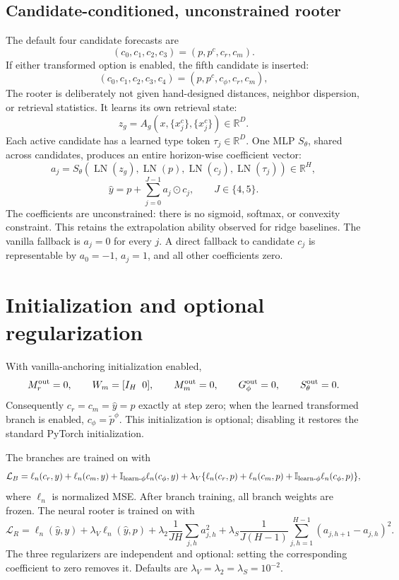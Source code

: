 \documentclass[10pt]{article}
\begin{document}
\subsection{Candidate-conditioned, unconstrained rooter}
The default four candidate forecasts are
\[
 (c_0,c_1,c_2,c_3)=(p,p^c,c_r,c_m).
\]
If either transformed option is enabled, the fifth candidate is inserted:
\[
(c_0,c_1,c_2,c_3,c_4)=(p,p^c,c_\phi,c_r,c_m),
\]
The rooter is deliberately not given hand-designed distances, neighbor
dispersion, or retrieval statistics.  It learns its own retrieval state:
\[
 z_g=A_g(x,\{x^c_j\},\{x^c_j\})\in\mathbb R^D.
\]
Each active candidate has a learned type token $\tau_j\in\mathbb R^D$.  One MLP
$S_\theta$, shared across candidates, produces an entire horizon-wise
coefficient vector:
\[
 a_j=S_\theta\!\left(
 \operatorname{LN}(z_g),\operatorname{LN}(p),
 \operatorname{LN}(c_j),\operatorname{LN}(\tau_j)
 \right)\in\mathbb R^H,
\]
\[
 \boxed{\quad \widehat y
 =p+\sum_{j=0}^{J-1}a_j\odot c_j,\qquad J\in\{4,5\}.\quad}
\]
The coefficients are unconstrained: there is no sigmoid, softmax, or convexity
constraint.  This retains the extrapolation ability observed for ridge
baselines.  The vanilla fallback is $a_j=0$ for every $j$.  A direct fallback
to candidate $c_j$ is representable by $a_0=-1$, $a_j=1$, and all other
coefficients zero.

\section{Initialization and optional regularization}
With vanilla-anchoring initialization enabled,
\[
 M_r^{\rm out}=0,\qquad W_m=[I_H\;\;0],\qquad M_m^{\rm out}=0,
 \qquad G_\phi^{\rm out}=0,
 \qquad S_\theta^{\rm out}=0.
\]
Consequently $c_r=c_m=\widehat y=p$ exactly at step zero; when the learned
transformed branch is enabled, $c_\phi=\widetilde p^\phi$.  This initialization
is optional; disabling it restores the standard PyTorch initialization.

The branches are trained on \Tone with
\[
 \mathcal L_B=
 \ell_n(c_r,y)+\ell_n(c_m,y)
 +\mathbb I_{\rm learn\text{-}\phi}\ell_n(c_\phi,y)
 +\lambda_V\{\ell_n(c_r,p)+\ell_n(c_m,p)
 +\mathbb I_{\rm learn\text{-}\phi}\ell_n(c_\phi,p)\},
\]
where $\ell_n$ is normalized MSE.  After branch training, all branch weights
are frozen.  The neural rooter is trained on \Ttwo with
\[
 \mathcal L_R=
 \ell_n(\widehat y,y)
 +\lambda_V\ell_n(\widehat y,p)
 +\lambda_2\frac1{JH}\sum_{j,h}a_{j,h}^2
 +\lambda_S\frac1{J(H-1)}
   \sum_{j,h=1}^{H-1}(a_{j,h+1}-a_{j,h})^2.
\]
The three regularizers are independent and optional: setting the corresponding
coefficient to zero removes it.  Defaults are
$\lambda_V=\lambda_2=\lambda_S=10^{-2}$.
\end{document}
